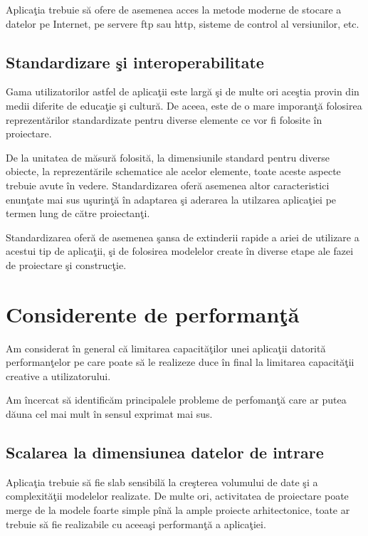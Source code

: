 Aplicaţia trebuie să ofere de asemenea acces la metode moderne de stocare a
datelor pe Internet, pe servere ftp sau http, sisteme de control al versiunilor,
etc.

\subsection{Standardizare şi interoperabilitate}

Gama utilizatorilor astfel de aplicaţii este largă şi de multe ori aceştia
provin din medii diferite de educaţie şi cultură. De aceea, este de o mare
imporanţă folosirea reprezentărilor standardizate pentru diverse elemente ce vor
fi folosite în proiectare.

De la unitatea de măsură folosită, la dimensiunile standard pentru diverse
obiecte, la reprezentările schematice ale acelor elemente, toate aceste aspecte
trebuie avute în vedere. Standardizarea oferă asemenea altor caracteristici
enunţate mai sus uşurinţă în adaptarea şi aderarea la utilzarea aplicaţiei pe
termen lung de către proiectanţi.

Standardizarea oferă de asemenea şansa de extinderii rapide a ariei de utilizare
a acestui tip de aplicaţii, şi de folosirea modelelor create în diverse etape
ale fazei de proiectare şi construcţie.

\section{Considerente de performanţă}

Am considerat în general că limitarea capacităţilor unei aplicaţii datorită
performanţelor pe care poate să le realizeze duce în final la limitarea
capacităţii creative a utilizatorului.

Am încercat să identificăm principalele probleme de perfomanţă care ar putea
dăuna cel mai mult în sensul exprimat mai sus.

\subsection{Scalarea la dimensiunea datelor de intrare}

Aplicaţia trebuie să fie slab sensibilă la creşterea volumului de date şi a
complexităţii modelelor realizate. De multe ori, activitatea de proiectare poate
merge de la modele foarte simple pînă la ample proiecte arhitectonice, toate ar
trebuie să fie realizabile cu aceeaşi performanţă a aplicaţiei.

